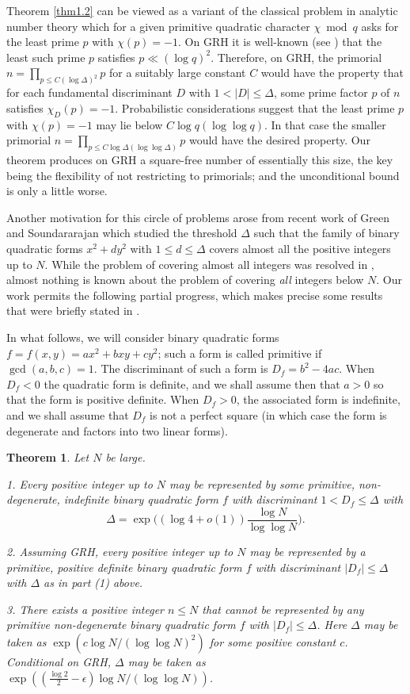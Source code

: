 \documentclass[11pt,makeidx, reqno]{amsart}
\theoremstyle{mystyle}
\newtheorem{theorem}{Theorem}[section]
\theoremstyle{definition}
\begin{document}
Theorem \ref{thm1.2} can be viewed as a variant of the classical problem in analytic number theory which for a given primitive quadratic character $\chi \bmod q$ asks for the least prime $p$ with $\chi(p)=-1$.  On GRH it is well-known (see \cite{ankenyTheLeast}) that the least such prime $p$ satisfies $p\ll (\log q)^2$.  Therefore, on GRH, the primorial $n=\prod_{p \le C(\log \Delta)^2} p$ for a suitably large constant $C$ would have the property that for each fundamental discriminant $D$ with $1<|D|\le \Delta$, some prime factor $p$ of $n$ satisfies $\chi_D(p)=-1$.  Probabilistic considerations suggest that the least prime $p$ with $\chi(p)=-1$ may lie below $C\log q (\log \log q)$.  In that case the smaller primorial $n=\prod_{p\le C \log \Delta (\log \log \Delta)} p$ would have the desired property.  Our theorem produces on GRH a square-free number of essentially this size, the key being the flexibility of not restricting to primorials; and the unconditional bound is only a little worse.  
 
\par Another motivation for this circle of problems arose from recent work of Green and Soundararajan \cite{greenCovering} which studied the threshold $\Delta$ such that the family of binary quadratic forms $x^2+ dy^2$ with $1\le d\le \Delta$ covers almost all the positive integers up to $N$.   While the problem of covering almost all integers was resolved in \cite{greenCovering}, almost nothing is known about the problem of covering {\sl all} integers below $N$.  Our work permits the following partial progress, which makes precise some results that were briefly stated in \cite{greenCovering}.   

In what follows, we will consider binary quadratic forms $f=f(x,y)=ax^2+bxy+cy^2$; such a form is called primitive if $\gcd(a,b,c)=1$.  The discriminant of such a form is $D_f = b^2-4ac$.  When $D_f<0$ the quadratic form is definite, and we shall assume then that $a>0$ so that the form is positive definite.   When $D_f>0$, the associated form is indefinite, and we shall assume that $D_f$ is not a perfect square (in which case the form is degenerate and factors into two linear forms).    

\begin{theorem} \label{thm1.3}  Let $N$ be large. 

1.   Every positive integer up to $N$ may be represented by some primitive, non-degenerate, indefinite binary quadratic form $f$ with discriminant $1< D_f \le \Delta$ with 
$$ 
\Delta = \exp\Big( (\log 4 +o(1)) \frac{\log N}{\log \log N}\Big). 
$$

2.  Assuming GRH, every positive integer up to $N$ may be represented by a primitive, positive definite binary quadratic form $f$ with discriminant $|D_f| \le \Delta$ with $\Delta$ as in part (1) above. 

3.  There exists a positive integer $n \le N$ that cannot be represented by any primitive non-degenerate binary quadratic form $f$ with $|D_f|\le \Delta$.  Here $\Delta$ may be taken as $\exp(c \log N/(\log \log N)^2)$ for some positive constant $c$.  Conditional on GRH, $\Delta$ may be taken as $\exp((\frac{\log 2}{2}-\epsilon) \log N/(\log \log N))$. 
\end{theorem}
 
\end{document}
